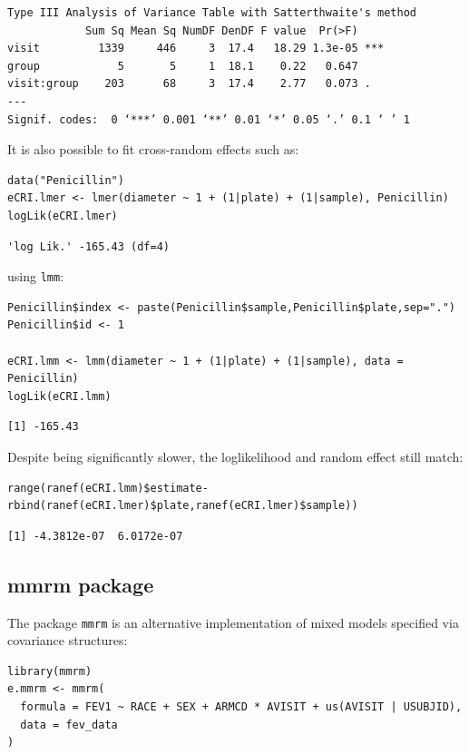\documentclass[12pt]{article}
\begin{document}
\begin{verbatim}
Type III Analysis of Variance Table with Satterthwaite's method
            Sum Sq Mean Sq NumDF DenDF F value  Pr(>F)    
visit         1339     446     3  17.4   18.29 1.3e-05 ***
group            5       5     1  18.1    0.22   0.647    
visit:group    203      68     3  17.4    2.77   0.073 .  
---
Signif. codes:  0 ‘***’ 0.001 ‘**’ 0.01 ‘*’ 0.05 ‘.’ 0.1 ‘ ’ 1
\end{verbatim}


It is also possible to fit cross-random effects such as:
\lstset{language=r,label= ,caption= ,captionpos=b,numbers=none}
\begin{lstlisting}
data("Penicillin")
eCRI.lmer <- lmer(diameter ~ 1 + (1|plate) + (1|sample), Penicillin)
logLik(eCRI.lmer)
\end{lstlisting}

\begin{verbatim}
'log Lik.' -165.43 (df=4)
\end{verbatim}



using \texttt{lmm}:
\lstset{language=r,label= ,caption= ,captionpos=b,numbers=none}
\begin{lstlisting}
Penicillin$index <- paste(Penicillin$sample,Penicillin$plate,sep=".")
Penicillin$id <- 1

eCRI.lmm <- lmm(diameter ~ 1 + (1|plate) + (1|sample), data = Penicillin)
logLik(eCRI.lmm)
\end{lstlisting}

\begin{verbatim}
[1] -165.43
\end{verbatim}


Despite being significantly slower, the loglikelihood and random
effect still match:
\lstset{language=r,label= ,caption= ,captionpos=b,numbers=none}
\begin{lstlisting}
range(ranef(eCRI.lmm)$estimate-rbind(ranef(eCRI.lmer)$plate,ranef(eCRI.lmer)$sample))
\end{lstlisting}

\begin{verbatim}
[1] -4.3812e-07  6.0172e-07
\end{verbatim}

\subsection{mmrm package}
\label{sec:org1f99a70}

The package \texttt{mmrm} is an alternative implementation of mixed models
specified via covariance structures:
\lstset{language=r,label= ,caption= ,captionpos=b,numbers=none}
\begin{lstlisting}
library(mmrm)
e.mmrm <- mmrm(
  formula = FEV1 ~ RACE + SEX + ARMCD * AVISIT + us(AVISIT | USUBJID),
  data = fev_data
)
\end{lstlisting}
\end{document}

